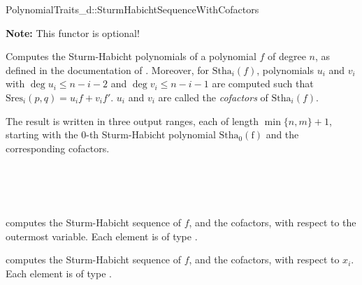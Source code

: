 \begin{ccRefConcept}{PolynomialTraits_d::SturmHabichtSequenceWithCofactors}

\textbf{Note:} This functor is optional!

\ccDefinition

Computes the Sturm-Habicht polynomials of a polynomial $f$ of degree $n$, 
as defined in the documentation of .
Moreover, for $\mathrm{Stha}_i(f)$, polynomials $u_i$ and $v_i$
with $\deg u_i\leq n-i-2$ and $\deg v_i\leq n-i-1$ are computed 
such that $\mathrm{Sres}_i(p,q)=u_i f + v_i f'$. $u_i$ and $v_i$ are called
the \emph{cofactors} of $\mathrm{Stha}_i(f)$.
 
The result is written in three output ranges, each of length $\min\{n,m\}+1$, 
starting with the $0$-th Sturm-Habicht polynomial $\mathrm{Stha_0(f)}$ 
and the corresponding cofactors.

\ccRefines 
{}\\
\\
\\


\ccOperations
{}
         { computes the Sturm-Habicht sequence of $f$, and the cofactors, 
           with respect to the outermost variable. Each element is of type
           .}

         { computes the Sturm-Habicht sequence of $f$, and the cofactors, 
           with respect to $x_i$. Each element is of type
           .}


\ccSeeAlso

\\
\\
\\
\\
\\
\\
\end{ccRefConcept}
